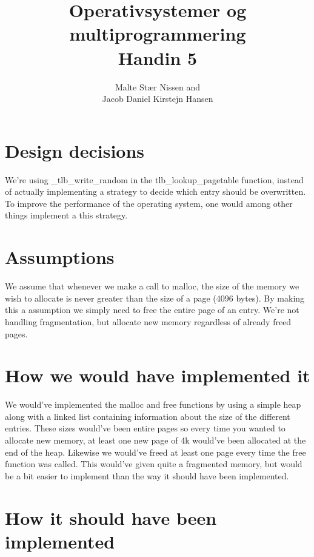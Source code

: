 \documentclass[11pt,a4paper]{article}
\title{Operativsystemer og multiprogrammering \\ Handin 5}
\author{Malte Stær Nissen and \\
        Jacob Daniel Kirstejn Hansen}
\begin{document}
\maketitle

\tableofcontents
\newpage

\section{Design decisions}
We're using \_tlb\_write\_random in the tlb\_lookup\_pagetable function,
instead of actually implementing a strategy to decide which entry should be
overwritten. To improve the performance of the operating system, one would
among other things implement a this strategy.

\section{Assumptions}
We assume that whenever we make a call to malloc, the size of the memory we
wish to allocate is never greater than the size of a page (4096 bytes). By
making this a assumption we simply need to free the entire page of an entry.
We're not handling fragmentation, but allocate new memory regardless of already
freed pages.


\section{How we would have implemented it}
We would've implemented the malloc and free functions by using a simple heap along with a linked list containing information about the size of the different entries. These sizes would've been entire pages so every time you wanted to allocate new memory, at least one new page of 4k would've been allocated at the end of the heap. Likewise we would've freed at least one page every time the free function was called. This would've given quite a fragmented memory, but would be a bit easier to implement than the way it should have been implemented.


\section{How it should have been implemented}
\end{document}
